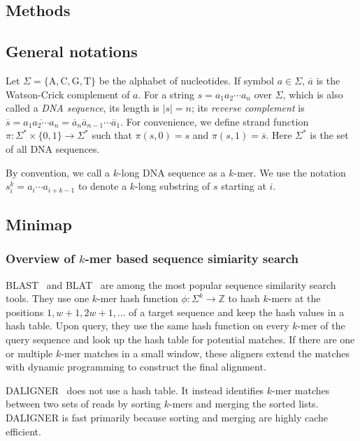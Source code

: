 \documentclass{bioinfo}
\begin{document}
\begin{methods}
\section{Methods}

\subsection{General notations}

Let $\Sigma=\{\mathrm{A},\mathrm{C},\mathrm{G},\mathrm{T}\}$ be the
alphabet of nucleotides. If symbol $a\in\Sigma$, $\overline{a}$ is the
Watson-Crick complement of $a$. For a string $s=a_1a_2\cdots a_n$ over
$\Sigma$, which is also called a \emph{DNA sequence}, its length is $|s|=n$;
its \emph{reverse complement} is $\overline{s}=\overline{a_1a_2\cdots
a_n}=\overline{a}_n\overline{a}_{n-1}\cdots\overline{a}_1$.
For convenience, we define strand function
$\pi:\Sigma^*\times\{0,1\}\to\Sigma^*$ such that $\pi(s,0)=s$ and
$\pi(s,1)=\overline{s}$. Here $\Sigma^*$ is the set of all DNA sequences.

By convention, we call a $k$-long DNA sequence as a $k$-mer. We use the
notation $s^k_i=a_i\cdots a_{i+k-1}$ to denote a $k$-long substring of $s$
starting at $i$.

\subsection{Minimap}

\subsubsection{Overview of $k$-mer based sequence simiarity search}\label{sec:minimapov}

BLAST~\citep{Altschul:1997vn} and BLAT~\citep{Kent:2002jk} are among the most
popular sequence similarity search tools. They use one $k$-mer hash function
$\phi:\Sigma^k\to\mathbb{Z}$ to hash $k$-mers at the positions
$1,w+1,2w+1,\ldots$ of a target sequence and keep the hash values in a hash
table. Upon query, they use the same hash function on every $k$-mer of the
query sequence and look up the hash table for potential matches. If there are
one or multiple $k$-mer matches in a small window, these aligners extend the
matches with dynamic programming to construct the final alignment.

DALIGNER~\citep{DBLP:conf/wabi/Myers14} does not use a hash table. It instead
identifies $k$-mer matches between two sets of reads by sorting $k$-mers and
merging the sorted lists. DALIGNER is fast primarily because sorting and
merging are highly cache efficient.


\end{methods}
\end{document}
